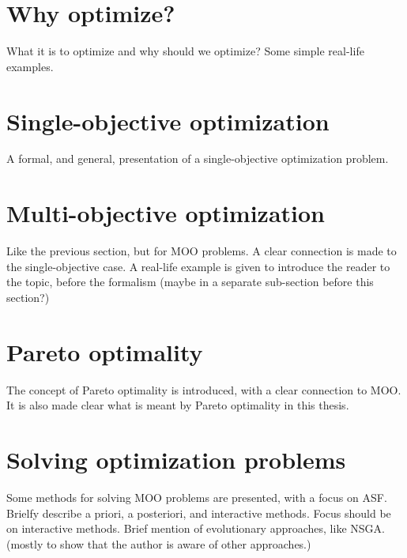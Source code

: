 \section{Why optimize?}
{\color{red}
What it is to optimize and why should we optimize? Some simple real-life examples.}
\section{Single-objective optimization}
{\color{red}
A formal, and general, presentation of a single-objective optimization problem.
}
\section{Multi-objective optimization}
{\color{red}
Like the previous section, but for MOO problems. A clear connection is made to the single-objective case. A real-life example is given to
introduce the reader to the topic, before the formalism (maybe in a separate sub-section before this section?)
}
\section{Pareto optimality}
{\color{red}
The concept of Pareto optimality is introduced, with a clear connection to MOO. It is also made clear what is meant by Pareto optimality in
this thesis.
}
\section{Solving optimization problems}
{\color{red}
Some methods for solving MOO problems are presented, with a focus on ASF. Brielfy describe a priori, a posteriori, and interactive methods.
Focus should be on interactive methods. Brief mention of evolutionary approaches, like NSGA. (mostly to show that the author is aware of other approaches.)
}